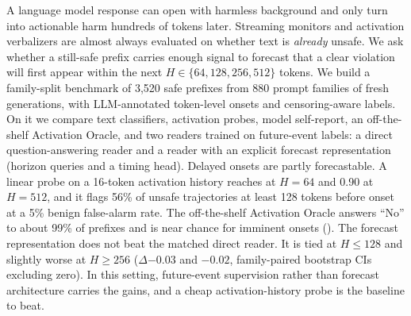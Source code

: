 A language model response can open with harmless background and only turn into actionable harm hundreds of tokens later. Streaming monitors and activation verbalizers are almost always evaluated on whether text is \emph{already} unsafe. We ask whether a still-safe prefix carries enough signal to forecast that a clear violation will first appear within the next $H\in\{64,128,256,512\}$ tokens. We build a family-split benchmark of 3,520 safe prefixes from 880 prompt families of fresh \qwen generations, with LLM-annotated token-level onsets and censoring-aware labels. On it we compare text classifiers, activation probes, model self-report, an off-the-shelf Activation Oracle, and two readers trained on future-event labels: a direct question-answering reader and a reader with an explicit forecast representation (horizon queries and a timing head). Delayed onsets are partly forecastable. A linear probe on a 16-token activation history reaches  at $H{=}64$ and 0.90 at $H{=}512$, and it flags 56\% of unsafe trajectories at least 128 tokens before onset at a 5\% benign false-alarm rate. The off-the-shelf Activation Oracle answers ``No'' to about 99\% of prefixes and is near chance for imminent onsets (). The forecast representation does not beat the matched direct reader. It is tied at $H\le128$ and slightly worse at $H\ge256$ ($\Delta$\auroc $-0.03$ and $-0.02$, family-paired bootstrap CIs excluding zero). In this setting, future-event supervision rather than forecast architecture carries the gains, and a cheap activation-history probe is the baseline to beat.

